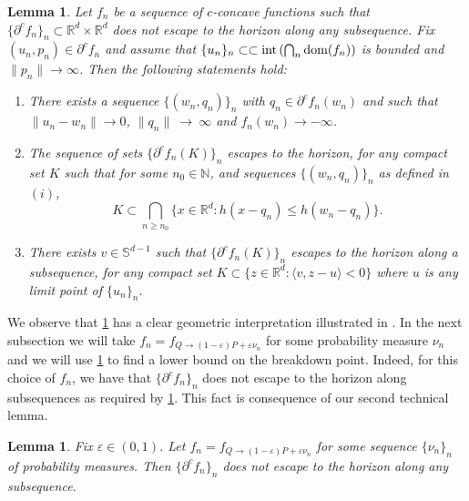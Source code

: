 \documentclass[11pt]{article}
\newcommand{\RR}{\mathbb{R}}
\newcommand{\R}{\RR}
\newcommand{\NN}{\mathbb{N}}
\theoremstyle{plain}
\newtheorem{lemma}[theorem]{Lemma}
\theoremstyle{definition}\newtheorem{definition}[theorem]{Definition}
\theoremstyle{remark}
\begin{document}
\begin{lemma}\label{lemma:technical}
    Let $f_n$ be a sequence of $c$-concave functions such that $\{\partial^c f_n\}_n \subset \R^{d}\times \R^d$ does not escape to the horizon along any subsequence. %
    Fix   $(u_n,p_n)\in\partial^c f_n  $ and assume that $\{u_n\}_n  \subset \subset  {\rm int}\left( \bigcap_n {\rm dom}(f_n) \right) $ is bounded
    and $\|p_n\|\to \infty$.
    Then the following statements hold:
    \begin{enumerate}
        \item  There exists a sequence  $\{(w_n,q_n)\}_n$ with $q_n\in \partial^c f_n(w_n)$ and such that $\|u_n-w_n\|\to 0$, $\|q_n\|~\to~\infty$ and $f_n(w_n)\to -\infty $.
        \item The sequence of sets $\{\partial^c f_{n}(K)\}_n$ escapes to the horizon, for any compact set $K$ such that for some $n_0\in \NN$, and sequences $\{(w_n,q_n)\}_n$ as defined in  $(i)$,
        \begin{equation}
        \label{eq:Compact-contained-intersect}
        K\subset  \bigcap_{n\geq n_0}\{ x \in \R^d: h(x-q_n) \leq  h(w_n-q_n) \} .
    \end{equation}
    \item   There exists $v\in \mathbb{S}^{d-1}$ such that  $\{\partial^c f_{n}(K)\}_n$ escapes to the horizon along a subsequence, for any compact set $K\subset \{z\in \R^d: \langle v, z -u\rangle<0\} $ where $u$ is any limit point of $\{u_n\}_n$. 
    \end{enumerate}
    
    
    
    
    
     
\end{lemma}
%
 We observe that \cref{lemma:technical} has a clear geometric interpretation illustrated in .
In the next subsection we will take $f_{n}= f_{Q\to (1-\varepsilon)P+\varepsilon \nu_n }$ for some  probability measure $\nu_n$ and we will use  \cref{lemma:technical} to find a lower bound on the breakdown point. Indeed, for this choice of  $f_{n}$, we have that $\{\partial^c f_n\}_n$ does not escape to the horizon along subsequences as required by \cref{lemma:technical}. This fact is consequence of our second technical lemma. 
%
\begin{lemma}\label{lemma:do-not-scape}
Fix $\varepsilon\in (0,1)$.     Let $f_{n}= f_{Q\to (1-\varepsilon)P+\varepsilon \nu_n }$ for some sequence $\{\nu_n\}_n$ of probability measures. Then $\{\partial^c f_n\}_n$ does not escape to the horizon along any subsequence.  
\end{lemma}
\end{document}
